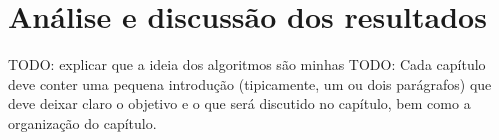 
\chapter{\larger Análise e discussão dos resultados}
\label{chap:analise_discussiva}

TODO: explicar que a ideia dos algoritmos são minhas
TODO: Cada capítulo deve conter uma pequena introdução (tipicamente, um ou dois parágrafos) que deve deixar claro o objetivo e o que será discutido no capítulo, bem como a organização do capítulo.








